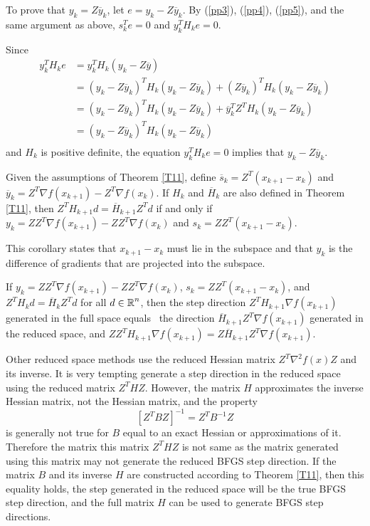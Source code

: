 {To prove that $y_k = Z \overline{y}_k$, let  $e = y_k - Z \overline{y}_k$.  
By (\ref{pp3}), (\ref{pp4}), (\ref{pp5}), and the same argument as above,
$s_k^Te = 0$ and $y_k^T H_k e = 0$.

Since
\[ \begin{array}{ll}
y_k^T H_k e &= y_k^T H_k (y_k - Z \overline{y}) \\
&= (y_k - Z \overline{y}_k)^T H_k (y_k - Z \overline{y}_k) + ( Z \overline{y}_k)^T H_k (y_k - Z \overline{y}_k) \\
&= (y_k - Z \overline{y}_k)^T H_k (y_k - Z \overline{y}_k) + \overline{y}_k^T Z^T  H_k (y_k - Z \overline{y}_k) \\
&= (y_k - Z \overline{y}_k)^T H_k (y_k - Z \overline{y}_k) \\
\end{array} \]
and $H_k$ is positive definite, the equation 
$y_k^T H_k e = 0$ implies that $y_k - Z \overline{y}_k$.
}

\begin{corollary} \label{T22}
Given the assumptions of Theorem \ref{T11}, define 
$ \overline{s}_k = Z^T \left( x_{k+1} -  x_{k} \right) $
and $ \overline{y}_k = Z^T \nabla f(x_{k+1}) -  Z^T \nabla f(x_{k}) $.
If $H_k$ and $\overline{H}_k$ are also defined in Theorem \ref{T11},
then $ Z^T {H}_{k+1} d =  \overline{H}_{k+1} Z^T d $ if and only
if $y_k = Z Z^T \nabla f(x_{k+1}) - Z Z^T \nabla f(x_{k})$
and $s_k = Z Z^T \left( x_{k+1} - x_{k} \right) $.
\end{corollary}

This corollary states that $x_{k+1} - x_k$ must
lie in the subspace and that $y_k$ is the difference
of gradients that are projected into the subspace.

\begin{corollary} \label{T33}
If $y_k = Z Z^T \nabla f(x_{k+1}) - Z Z^T \nabla f(x_{k})$,
$s_k = Z Z^T \left( x_{k+1} - x_{k} \right)$, and
$ Z^T {H}_{k} d =  \overline{H}_{k} Z^T d $
for all $d \in \mbox{${\mathbb R}$}^n$, then the step direction
$Z^T H_{k+1} \nabla f(x_{k+1}) $ generated in the full space equals \
the direction  $\overline{H}_{k+1} Z^T \nabla f(x_{k+1}) $ generated in the
reduced space, and 
$Z Z^T H_{k+1} \nabla f(x_{k+1}) = Z \overline{H}_{k+1} Z^T \nabla f(x_{k+1})$.
\end{corollary}

Other reduced space methods use the reduced Hessian matrix
$Z^T \nabla^2 f(x) Z$ and its inverse.
It is very tempting generate a step direction in the
reduced space using the reduced matrix $Z^T H Z$.  However,
the matrix $H$ approximates the inverse Hessian matrix, not
the Hessian matrix, and the property
\[ \left[ Z^T B Z \right]^{-1} = Z^T B^{-1} Z \]
is generally not true for $B$ equal to an exact Hessian or 
approximations of it.
Therefore the matrix this matrix  $Z^T H Z$ 
is not same as the matrix generated using this
matrix may not generate the reduced BFGS step direction.
If the matrix $B$ and its inverse $H$ are 
constructed according to Theorem \ref{T11}, then
this equality holds, the step generated in the reduced space
will be the true BFGS step direction, and the full matrix $H$ can be
used to generate BFGS step directions.


